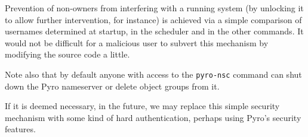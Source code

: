 
Prevention of non-owners from interfering with a running system (by
unlocking it to allow further intervention, for instance) is achieved
via a simple comparison of usernames determined at startup, in the
scheduler and in the other commands. It would not be difficult for a
malicious user to subvert this mechanism by modifying the source code a
little. 

Note also that by default anyone with access to the \lstinline=pyro-nsc=
command can shut down the Pyro nameserver or delete object groups from
it. 

If it is deemed necessary, in the future, we may replace this simple
security mechanism with some kind of hard authentication, perhaps using
Pyro's security features.
